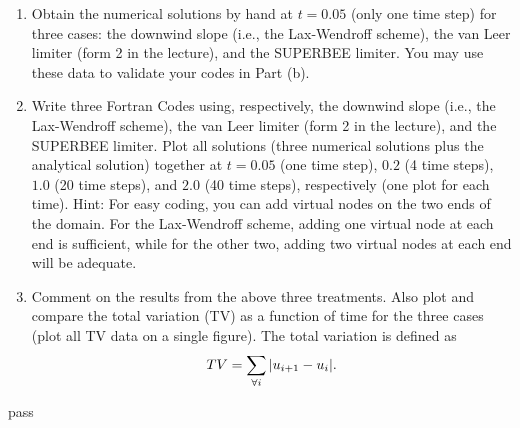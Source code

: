 \begin{homework}[label={H:6-2}]
    \begin{enumerate}[label=(\alph*)]
        \item Obtain the numerical solutions by hand at $t=0.05$ (only one time step) for three cases: the downwind slope (i.e., the Lax-Wendroff scheme), the van Leer limiter (form 2 in the lecture), and the SUPERBEE limiter. You may use these data to validate your codes in Part (b).
        \item Write three Fortran Codes using, respectively, the downwind slope (i.e., the Lax-Wendroff scheme), the van Leer limiter (form 2 in the lecture), and the SUPERBEE  limiter. Plot all solutions (three numerical solutions plus the analytical solution) together at $t=0.05$ (one time step), $0.2$ (4 time steps), $1.0$ (20 time steps), and $2.0$ (40 time steps), respectively (one plot for each time). Hint: For easy coding, you can add virtual nodes on the two ends of the domain. For the Lax-Wendroff scheme, adding one virtual node at each end is sufficient, while for the other two, adding two virtual nodes at each end will be adequate.
        \item Comment on the results from the above three treatments. Also plot and compare the total variation (TV) as a function of time for the three cases (plot all TV data on a single figure). The total variation is defined as
            \begin{equation}\label{E:6-2-4}
                TV = \sum_{\forall i}\abs{u_{i+1}-u_i}.
            \end{equation}
    \end{enumerate}
\end{homework}

pass



